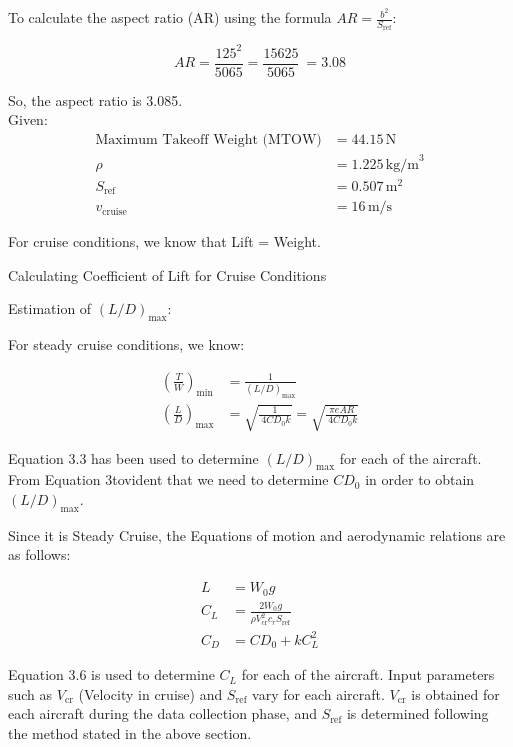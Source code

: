 \documentclass[12 pt]{article}
\begin{document}
To calculate the aspect ratio (AR) using the formula $AR = \frac{b^2}{S_{\text{ref}}}$:

\[
AR = \frac{125^2}{5065} = \frac{15625}{5065} \ =  3.08
\]

So, the aspect ratio is 3.085.\\

Given:
\begin{align*}
    \text{Maximum Takeoff Weight (MTOW)} & = 44.15 \, \text{N} \\
    \rho & = 1.225 \, \text{kg/m}^3 \\
    S_{\text{ref}} & = 0.507 \, \text{m}^2 \\
    v_{\text{cruise}} & = 16 \, \text{m/s}
\end{align*}


For cruise conditions, we know that Lift = Weight.

{Calculating Coefficient of Lift for Cruise Conditions}

Estimation of $(L/D)_{\text{max}}$:

For steady cruise conditions, we know:

\begin{align}
\left(\frac{T}{W}\right)_{\min} &= \frac{1}{(L/D)_{\text{max}}} \tag{3.3} \\
\left(\frac{L}{D}\right)_{\text{max}} &= \sqrt{\frac{1}{\ 4CD_0 k}} = \sqrt{\frac{\pi e AR}{\ 4CD_0 k}} \tag{3.4}
\end{align}

Equation 3.3 has been used to determine $(L/D)_{\text{max}}$ for each of the aircraft. From Equation 3tovident that we need to determine $CD_0$ in order to obtain $(L/D)_{\text{max}}$.

Since it is Steady Cruise, the Equations of motion and aerodynamic relations are as follows:

\begin{align}
L &= W_0g \tag{3.5} \\
C_L &= \frac{2W_0g}{\rho V^2_{\text{cr}} c_r S_{\text{ref}}} \tag{3.6} \\
C_D &= CD_0 + kC_L^2 \tag{3.7}
\end{align}

Equation 3.6 is used to determine $C_L$ for each of the aircraft. Input parameters such as $V_{\text{cr}}$ (Velocity in cruise) and $S_{\text{ref}}$ vary for each aircraft. $V_{\text{cr}}$ is obtained for each aircraft during the data collection phase, and $S_{\text{ref}}$ is determined following the method stated in the above section.
\end{document}
